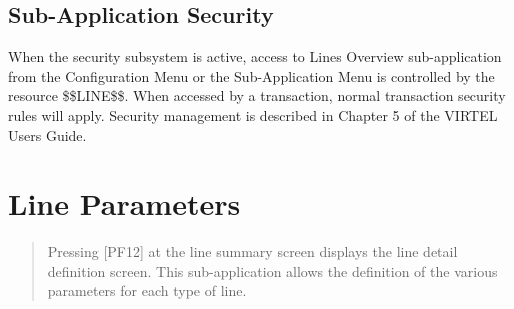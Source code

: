 \documentclass[letterpaper,10pt,english]{sphinxmanual}
\begin{document}
\subsection{Sub-Application Security}
\label{\detokenize{connectivity_guide:id1}}
When the security subsystem is active, access to Lines Overview sub-application from the Configuration Menu or the Sub-Application Menu is controlled by the resource \$\$LINE\$\$. When accessed by a transaction, normal transaction security rules will apply. Security management is described in Chapter 5 of the VIRTEL Users Guide.


\section{Line Parameters}
\label{\detokenize{connectivity_guide:line-parameters}}\begin{quote}

Pressing {[}PF12{]} at the line summary screen displays the line detail definition screen. This sub-application allows the definition of the various parameters for each type of line.
\end{quote}
\end{document}
